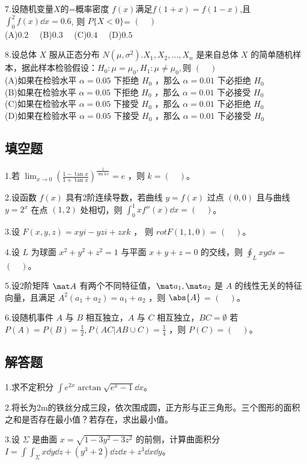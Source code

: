 7.设随机变量$X$的=概率密度 $f(x)$满足$f(1+x)=f(1-x)$,且 $\int_0^2 f(x)\dd{x}=0.6$, 则 $P\{X<0\}$= $(\quad)$\\
(A)$0.2 \quad$
(B)$0.3 \quad$
(C)$0.4 \quad$
(D)$0.5 \quad$


8.设总体 $X$ 服从正态分布 $N(\mu,\sigma^2).X_1,X_2,\dots,X_n$ 是来自总体 $X$ 的简单随机样本，据此样本检验假设：$H_0:\mu=\mu_0,H_1:\mu\neq \mu_0,$则 $(\quad)$\\
(A)如果在检验水平 $\alpha=0.05$ 下拒绝 $H_0$ ，那么 $\alpha=0.01$ 下必拒绝 $H_0$\\
(B)如果在检验水平 $\alpha=0.05$ 下拒绝 $H_0$ ，那么 $\alpha=0.01$ 下必接受 $H_0$\\
(C)如果在检验水平 $\alpha=0.05$ 下接受 $H_0$ ，那么 $\alpha=0.01$ 下必拒绝 $H_0$\\
(D)如果在检验水平 $\alpha=0.05$ 下接受 $H_0$ ，那么 $\alpha=0.01$ 下必接受 $H_0$

\subsection{填空题}
1.若 $\displaystyle \lim_{x \to  0} (\frac{1-\tan x}{1+\tan x})^\frac{1}{\sin kx}=e$ ，则 $k=(\quad)$。

2.设函数 $f(x)$ 具有2阶连续导数，若曲线 $y=f(x)$ 过点 $(0,0)$ 且与曲线 $y=2^x$ 在点 $(1,2)$ 处相切，则 $\int_0^1 xf''(x) \dd{x}= (\quad)$。

3.设 $F(x,y,z)=xyi-yzi+zxk$ ， 则 $rot  F(1,1,0)$ = $(\quad)$。

4.设 $L$ 为球面 $x^2+y^2+z^2=1$ 与平面 $x+y+z=0$ 的交线，则 $\oint_L xy\dd{s}$ = $(\quad)$。

5.设2阶矩阵 $\mat A$ 有两个不同特征值，$\mat a_1,\mat a_2$  是 $A$ 的线性无关的特征向量，且满足 $A^2(a_1+a_2)=a_1+a_2$ ，则 $\abs{A}$ = $(\quad)$。

6.设随机事件 $A$ 与 $B$ 相互独立，$A$ 与 $C$ 相互独立，$BC=\emptyset$ 若 $P(A)=P(B)=\frac{1}{2},P(AC|AB \cup C)=\frac{1}{4}$ ，则 $P(C)= (\quad)$。

\subsection{解答题}
1.求不定积分 $\displaystyle \int e^{2x}\arctan \sqrt{e^x-1}\dd{x}$。

2.将长为2m的铁丝分成三段，依次围成圆，正方形与正三角形。三个图形的面积之和是否存在最小值？若存在，求出最小值。

3.设 $\Sigma$ 是曲面 $x=\sqrt{1-3y^2-3z^2}$ 的前侧，计算曲面积分 $\displaystyle I=\int\int_\Sigma x\dd{y}\dd{z}+(y^3+2)\dd{z}\dd{x}+z^3 \dd{x}\dd{y}$。

